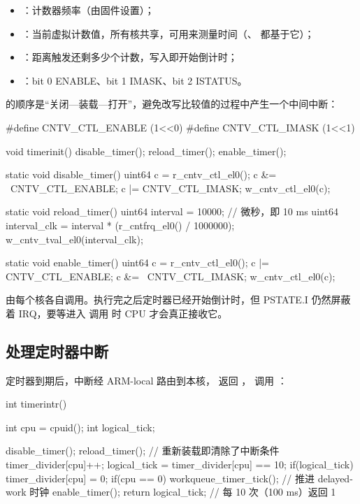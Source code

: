 \begin{itemize}
  \item {}：计数器频率（由固件设置）；
  \item {}：当前虚拟计数值，所有核共享，可用来测量时间（、 都基于它）；
  \item {}：距离触发还剩多少个计数，写入即开始倒计时；
  \item {}：bit 0 ENABLE、bit 1 IMASK、bit 2 ISTATUS。
\end{itemize}

 的顺序是“关闭—装载—打开”，避免改写比较值的过程中产生一个中间中断：

\begin{ccode}
#define CNTV_CTL_ENABLE   (1<<0)
#define CNTV_CTL_IMASK    (1<<1)

void timerinit()
{
  disable_timer();
  reload_timer();
  enable_timer();
}

static void disable_timer()
{
  uint64 c = r_cntv_ctl_el0();
  c &= ~CNTV_CTL_ENABLE;
  c |= CNTV_CTL_IMASK;
  w_cntv_ctl_el0(c);
}

static void reload_timer()
{
  uint64 interval = 10000;                                   // 微秒，即 10 ms
  uint64 interval_clk = interval * (r_cntfrq_el0() / 1000000);
  w_cntv_tval_el0(interval_clk);
}

static void enable_timer()
{
  uint64 c = r_cntv_ctl_el0();
  c |= CNTV_CTL_ENABLE;
  c &= ~CNTV_CTL_IMASK;
  w_cntv_ctl_el0(c);
}
\end{ccode}

 由每个核各自调用。执行完之后定时器已经开始倒计时，但 PSTATE.I 仍然屏蔽着 IRQ，要等进入  调用  时 CPU 才会真正接收它。

\subsection{处理定时器中断}

定时器到期后，中断经 ARM-local 路由到本核， 返回 ， 调用 ：

\begin{ccode}
int timerintr()
{
  int cpu = cpuid();
  int logical_tick;

  disable_timer();
  reload_timer();                       // 重新装载即清除了中断条件
  timer_divider[cpu]++;
  logical_tick = timer_divider[cpu] == 10;
  if(logical_tick)
    timer_divider[cpu] = 0;
  if(cpu == 0)
    workqueue_timer_tick();             // 推进 delayed-work 时钟
  enable_timer();
  return logical_tick;                  // 每 10 次（100 ms）返回 1
}
\end{ccode}

